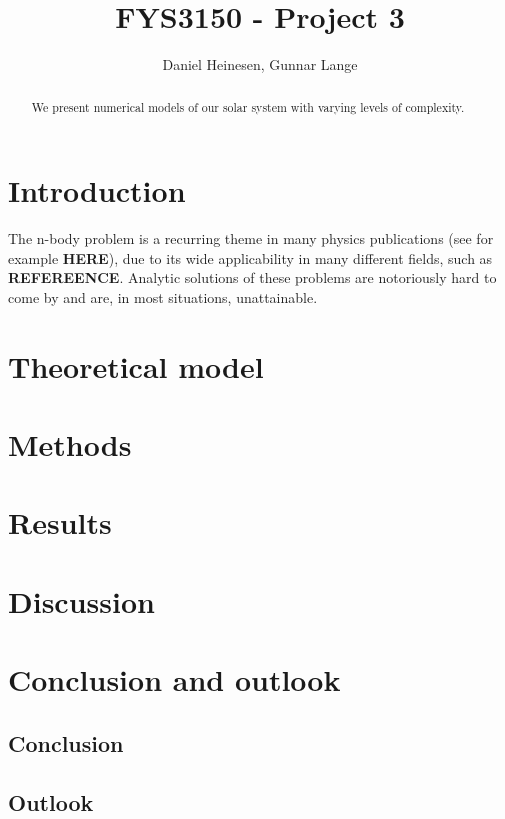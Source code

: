 \documentclass[a4paper, 10pt]{article}
\title{FYS3150 - Project 3}
\author{Daniel Heinesen, Gunnar Lange}
\begin{document}
\maketitle
\begin{abstract}
We present numerical models of our solar system with varying levels of complexity.
\end{abstract}

\tableofcontents
\newpage
\section{Introduction}
The n-body problem is a recurring theme in many physics publications (see for example \textbf{HERE}), due to its wide applicability in many different fields, such as \textbf{REFEREENCE}.  Analytic solutions of these problems are notoriously hard to come by and are, in most situations, unattainable. 
\section{Theoretical model}\label{Theoretical_section}
\section{Methods}
\section{Results}
\section{Discussion}
\section{Conclusion and outlook}
\subsection{Conclusion}
\subsection{Outlook}
\end{document}

